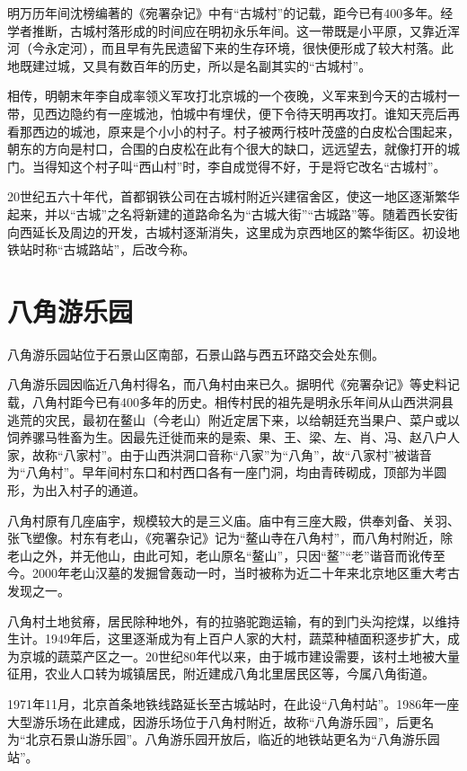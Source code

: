 明万历年间沈榜编著的《宛署杂记》中有“古城村”的记载，距今已有400多年。经学者推断，古城村落形成的时间应在明初永乐年间。这一带既是小平原，又靠近浑河（今永定河），而且早有先民遗留下来的生存环境，很快便形成了较大村落。此地既建过城，又具有数百年的历史，所以是名副其实的“古城村”。

相传，明朝末年李自成率领义军攻打北京城的一个夜晚，义军来到今天的古城村一带，见西边隐约有一座城池，怕城中有埋伏，便下令待天明再攻打。谁知天亮后再看那西边的城池，原来是个小小的村子。村子被两行枝叶茂盛的白皮松合围起来，朝东的方向是村口，合围的白皮松在此有个很大的缺口，远远望去，就像打开的城门。当得知这个村子叫“西山村”时，李自成觉得不好，于是将它改名“古城村”。

20世纪五六十年代，首都钢铁公司在古城村附近兴建宿舍区，使这一地区逐渐繁华起来，并以“古城”之名将新建的道路命名为“古城大街”“古城路”等。随着西长安街向西延长及周边的开发，古城村逐渐消失，这里成为京西地区的繁华街区。初设地铁站时称“古城路站”，后改今称。

\section{八角游乐园}
八角游乐园站位于石景山区南部，石景山路与西五环路交会处东侧。

八角游乐园因临近八角村得名，而八角村由来已久。据明代《宛署杂记》等史料记载，八角村距今已有400多年的历史。相传村民的祖先是明永乐年间从山西洪洞县逃荒的灾民，最初在鳌山（今老山）附近定居下来，以给朝廷充当果户、菜户或以饲养骡马牲畜为生。因最先迁徙而来的是索、果、王、梁、左、肖、冯、赵八户人家，故称“八家村”。由于山西洪洞口音称“八家”为“八角”，故“八家村”被谐音为“八角村”。早年间村东口和村西口各有一座门洞，均由青砖砌成，顶部为半圆形，为出入村子的通道。

八角村原有几座庙宇，规模较大的是三义庙。庙中有三座大殿，供奉刘备、关羽、张飞塑像。村东有老山，《宛署杂记》记为“鳌山寺在八角村”，而八角村附近，除老山之外，并无他山，由此可知，老山原名“鳌山”，只因“鳌”“老”谐音而讹传至今。2000年老山汉墓的发掘曾轰动一时，当时被称为近二十年来北京地区重大考古发现之一。

八角村土地贫瘠，居民除种地外，有的拉骆驼跑运输，有的到门头沟挖煤，以维持生计。1949年后，这里逐渐成为有上百户人家的大村，蔬菜种植面积逐步扩大，成为京城的蔬菜产区之一。20世纪80年代以来，由于城市建设需要，该村土地被大量征用，农业人口转为城镇居民，附近建成八角北里居民区等，今属八角街道。

1971年11月，北京首条地铁线路延长至古城站时，在此设“八角村站”。1986年一座大型游乐场在此建成，因游乐场位于八角村附近，故称“八角游乐园”，后更名为“北京石景山游乐园”。八角游乐园开放后，临近的地铁站更名为“八角游乐园站”。

